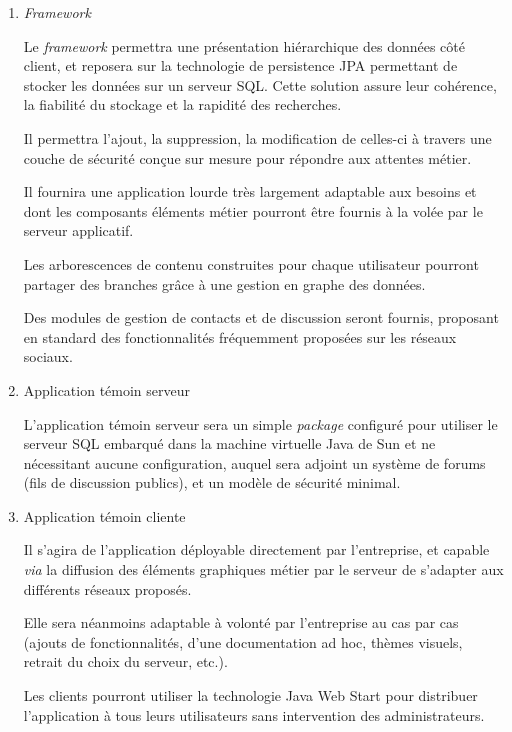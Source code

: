 \begin{enumerate}

 \item \textit{Framework}

Le \textit{framework} permettra une présentation hiérarchique des données côté client, et reposera sur la technologie de persistence JPA permettant de stocker les données sur un serveur SQL. Cette solution assure leur cohérence, la fiabilité du stockage et la rapidité des recherches.

Il permettra l'ajout, la suppression, la modification de celles-ci à travers une couche de sécurité conçue sur mesure pour répondre aux attentes métier.

Il fournira une application lourde très largement adaptable aux besoins et dont les composants éléments métier pourront être fournis à la volée par le serveur applicatif.

Les arborescences de contenu construites pour chaque utilisateur pourront partager des branches grâce à une gestion en graphe des données.

Des modules de gestion de contacts et de discussion seront fournis, proposant en standard des fonctionnalités fréquemment proposées sur les réseaux sociaux.

 \item Application témoin serveur

L'application témoin serveur sera un simple \emph{package} configuré pour utiliser le serveur SQL embarqué dans la machine virtuelle Java de Sun et ne nécessitant aucune configuration, auquel sera adjoint un système de forums (fils de discussion publics), et un modèle de sécurité minimal.

 \item Application témoin cliente

Il s'agira de l'application déployable directement par l'entreprise, et capable \emph{via} la diffusion des éléments graphiques métier par le serveur de s'adapter aux différents réseaux proposés.

Elle sera néanmoins adaptable à volonté par l'entreprise au cas par cas (ajouts de fonctionnalités, d'une documentation ad hoc, thèmes visuels, retrait du choix du serveur, etc.).

Les clients pourront utiliser la technologie Java Web Start pour distribuer l'application à tous leurs utilisateurs sans intervention des administrateurs.

\end{enumerate}
